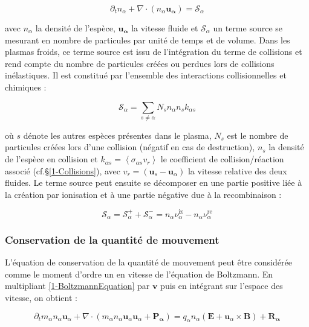 \begin{refsection}
\begin{equation}
\label{1-eqContinuite}
	\partial_tn_\alpha+
	\nabla\cdot\left(n_\alpha\mathbf{u_\alpha}\right)=\mathcal{S}_\alpha
\end{equation}

avec $n_\alpha$ la densité de l'espèce, $\mathbf{u_\alpha}$ la vitesse
fluide et $\mathcal{S}_\alpha$ un terme source se mesurant en nombre de
particules par unité de temps et de volume. Dans les plasmas froids, ce terme source est issu
de l'intégration du terme de collisions et rend compte du nombre de particules
créées ou perdues lors de collisions inélastiques. Il est constitué
par l'ensemble des interactions collisionnelles et chimiques :

\begin{equation}
	\mathcal{S}_\alpha=\sum_{s\neq\alpha} N_s n_{\alpha}n_{s}k_{\alpha
	s}
\end{equation} 

où $s$ dénote les
autres espèces présentes dans le plasma, $N_s$ est le nombre de particules
créées lors d'une collision (négatif en cas de destruction), $n_s$ la densité de
l'espèce en collision et $k_{\alpha s}=\left<\sigma_{\alpha s} v_r\right>$ le coefficient de collision/réaction
associé (cf.\S\ref{1-Collisions}), avec $v_r=(\mathbf u_s-\mathbf u_\alpha)$
la vitesse relative des deux fluides. Le terme source peut ensuite se décomposer
en une partie positive liée à la création par ionisation et à une partie
négative due à la recombinaison :

\begin{equation}
	\mathcal{S}_\alpha=\mathcal{S}_\alpha^++\mathcal{S}_\alpha^-=n_{\alpha}\nu_\alpha^\text{iz}-n_{\alpha}\nu_\alpha^\text{re}
\end{equation} 


\subsubsection{Conservation de la quantité de mouvement}
L'équation de conservation de la quantité de mouvement peut être considérée
comme le moment d'ordre un en vitesse de l'équation de Boltzmann. En multipliant
\eqref{1-BoltzmannEquation} par $\mathbf v$ puis en intégrant sur l'espace des
vitesse, on obtient :

\begin{equation}
\label{1-eqQuantiteMouvement}
\partial_t m_\alpha n_\alpha \mathbf{u}_\alpha + 
\nabla\cdot\left(m_\alpha n_\alpha
\mathbf{u}_\alpha\mathbf{u}_\alpha+\mathbf{P_\alpha}\right)=q_\alpha
n_\alpha\left(\mathbf E+\mathbf u_\alpha\times\mathbf B\right)
+\mathbf{R_\alpha}
\end{equation}


\end{refsection}
